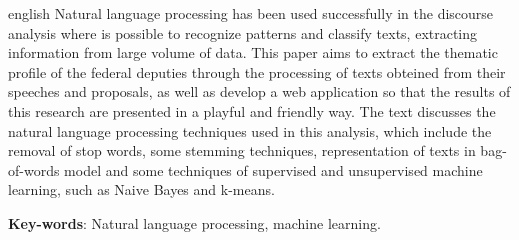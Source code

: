 \begin{resumo}[Abstract]
 \begin{otherlanguage*}{english}
   Natural language processing has been used successfully in the discourse analysis where is possible to recognize patterns and classify texts, extracting information from large volume of data. This paper aims to extract the thematic profile of the federal deputies through the processing of texts obteined from their speeches and proposals, as well as develop a web application so that the results of this research are presented in a playful and friendly way. The text discusses the natural language processing techniques used in this analysis, which include the removal of stop words, some stemming techniques, representation of texts in bag-of-words model and some techniques of supervised and unsupervised machine learning, such as Naive Bayes and k-means.

   \vspace{\onelineskip}

   \noindent
   \textbf{Key-words}: Natural language processing, machine learning.
 \end{otherlanguage*}
\end{resumo}
